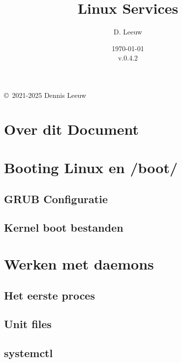 \documentclass[a4paper,12pt,twoside,openright,titlepage]{book}
\author{D. Leeuw}
\title{Linux Services}
\date{\today\\v.0.4.2}
\begin{document}

\maketitle

\copyright\ 2021-2025 Dennis Leeuw\\




\frontmatter
\chapter{Over dit Document}
%
%

\tableofcontents

\mainmatter

\chapter{Booting Linux en /boot/}

\section{GRUB Configuratie}

\section{Kernel boot bestanden}


\chapter{Werken met daemons}

\section{Het eerste proces}

\section{Unit files}

\section{systemctl}

\end{document}
